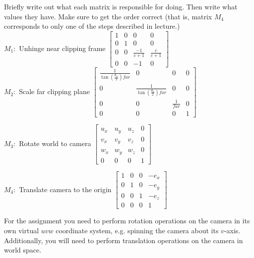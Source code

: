 \documentclass[10pt,twocolumn]{article}
\begin{document}
\begin{framed}
\noindent {\bf [1/2 pt. each]} Briefly write out what each matrix is responsible for doing. Then write what values they have. Make sure to get the order correct (that is, matrix $M_4$ corresponds to only one of the steps described in lecture.)\\

$M_1:$ Unhinge near clipping frame
$\begin{bmatrix}
    1 & 0 & 0 & 0 \\
    0 & 1 & 0 & 0 \\
    0 & 0 & \frac{-1}{c+1} & \frac{c}{c+1} \\
    0 & 0 & -1 & 0
\end{bmatrix}$\\

\vspace{3em}
$M_2:$ Scale far clipping plane
\vspace{1em}
$\begin{bmatrix}
    \frac{1}{\tan(\frac{\theta_w}{2})far} & 0 & 0 & 0 \\
    0 & \frac{1}{\tan(\frac{\theta_h}{2})far} & 0 & 0 \\
    0 & 0 & \frac{1}{far} & 0 \\
    0 & 0 & 0 & 1
\end{bmatrix}$

\vspace{3em}
$M_3:$ Rotate world to camera
\vspace{1em}
$\begin{bmatrix}
    u_x & u_y & u_z & 0 \\
    v_x & v_y & v_z & 0 \\
    w_x & w_y & w_z & 0 \\
    0 & 0 & 0 & 1
\end{bmatrix}$

\vspace{3em}
$M_4:$ Translate camera to the origin
\vspace{1em}
$\begin{bmatrix}
    1 & 0 & 0 & -e_x \\
    0 & 1 & 0 & -e_y \\
    0 & 0 & 1 & -e_z \\
    0 & 0 & 0 & 1
\end{bmatrix}$


\end{framed}
\noindent For the assignment you need to perform rotation operations on the camera in its own virtual $uvw$ coordinate system, e.g. spinning the camera about its $v$-axis. Additionally, you will need to perform translation operations on the camera in world space.
\end{document}
